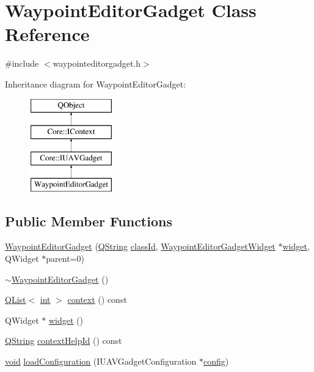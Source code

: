 \hypertarget{class_waypoint_editor_gadget}{\section{Waypoint\-Editor\-Gadget Class Reference}
\label{class_waypoint_editor_gadget}
}


{\ttfamily \#include $<$waypointeditorgadget.\-h$>$}

Inheritance diagram for Waypoint\-Editor\-Gadget\-:\begin{figure}[H]
\begin{center}
\leavevmode
\includegraphics[height=4.000000cm]{class_waypoint_editor_gadget}
\end{center}
\end{figure}
\subsection*{Public Member Functions}
\begin{DoxyCompactItemize}
\item 
\hyperlink{group___waypoint_editor_gadget_plugin_gafb34f259f81e6e7a200d84a3b955734f}{Waypoint\-Editor\-Gadget} (\hyperlink{group___u_a_v_objects_plugin_gab9d252f49c333c94a72f97ce3105a32d}{Q\-String} \hyperlink{group___core_plugin_ga3878fde66a57220608960bcc3fbeef2c}{class\-Id}, \hyperlink{class_waypoint_editor_gadget_widget}{Waypoint\-Editor\-Gadget\-Widget} $\ast$\hyperlink{group___waypoint_editor_gadget_plugin_ga5c05d17087d355a8f6a0c428c89ccb09}{widget}, Q\-Widget $\ast$parent=0)
\item 
\hyperlink{group___waypoint_editor_gadget_plugin_ga3cdba64c9d39d71291529e2929a63552}{$\sim$\-Waypoint\-Editor\-Gadget} ()
\item 
\hyperlink{class_q_list}{Q\-List}$<$ \hyperlink{ioapi_8h_a787fa3cf048117ba7123753c1e74fcd6}{int} $>$ \hyperlink{group___waypoint_editor_gadget_plugin_ga90adc26647456b7dcb4bfc8fb0fb80d1}{context} () const 
\item 
Q\-Widget $\ast$ \hyperlink{group___waypoint_editor_gadget_plugin_ga5c05d17087d355a8f6a0c428c89ccb09}{widget} ()
\item 
\hyperlink{group___u_a_v_objects_plugin_gab9d252f49c333c94a72f97ce3105a32d}{Q\-String} \hyperlink{group___waypoint_editor_gadget_plugin_ga9aa5c62f07b81e2a3e782fe2581e7a9d}{context\-Help\-Id} () const 
\item 
\hyperlink{group___u_a_v_objects_plugin_ga444cf2ff3f0ecbe028adce838d373f5c}{void} \hyperlink{group___waypoint_editor_gadget_plugin_ga14051e5dfbb5586837f5a4c092d4ef4c}{load\-Configuration} (I\-U\-A\-V\-Gadget\-Configuration $\ast$\hyperlink{deflate_8c_a4473b5227787415097004fd39f55185e}{config})
\end{DoxyCompactItemize}
